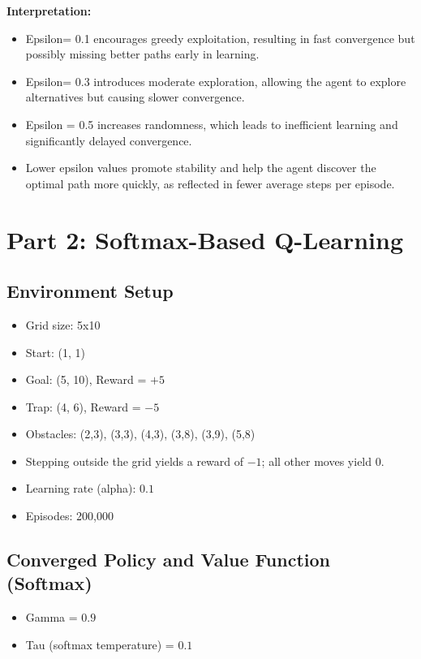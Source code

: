\documentclass[12pt]{article}
\begin{document}
\textbf{Interpretation:}
\begin{itemize}
  \item Epsilon= 0.1 encourages greedy exploitation, resulting in fast convergence but possibly missing better paths early in learning.
  \item Epsilon= 0.3 introduces moderate exploration, allowing the agent to explore alternatives but causing slower convergence.
  \item Epsilon = 0.5 increases randomness, which leads to inefficient learning and significantly delayed convergence.
  \item Lower epsilon values promote stability and help the agent discover the optimal path more quickly, as reflected in fewer average steps per episode.
\end{itemize}

\section{Part 2: Softmax-Based Q-Learning}

\subsection{Environment Setup}
\begin{itemize}
  \item Grid size: 5x10
  \item Start: (1, 1)
  \item Goal: (5, 10), Reward = \(+5\)
  \item Trap: (4, 6), Reward = \(-5\)
  \item Obstacles: (2,3), (3,3), (4,3), (3,8), (3,9), (5,8)
  \item Stepping outside the grid yields a reward of \(-1\); all other moves yield 0.
  \item Learning rate (alpha): \(0.1\)
  \item Episodes: 200,000
\end{itemize}

\subsection{Converged Policy and Value Function (Softmax)}
\begin{itemize}
  \item Gamma = \(0.9\)
  \item Tau (softmax temperature) = \(0.1\)
\end{itemize}
\end{document}

